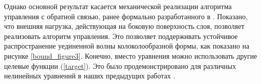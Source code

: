 Однако основной результат касается механической реализации алгоритма управления с обратной связью, ранее формально разработанного в \cite{bound_horizont, bound_fradkov, porant16, bound_porandr17, porant17}. Показано, что внешняя нагрузка, действующая на боковую поверхность слоя, позволяет реализовать алгоритм управления. Это позволяет поддерживать устойчивое распространение уединенной волны колоколообразной формы, как показано на рисунке \ref{bound_figure3}. Конечно, вместо уравнения можно использовать другие целевые функции (\ref{target}). Это было продемонстрировано для различных нелинейных уравнений в наших предыдущих работах \cite{porant16, bound_porandr17, porant17}.